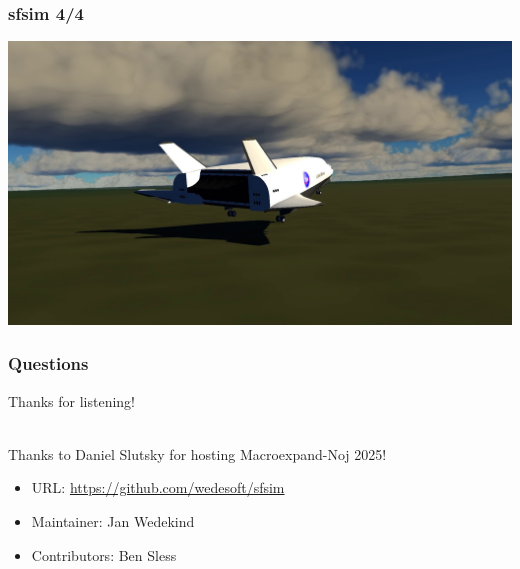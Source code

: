 \documentclass[aspectratio=169,11pt,xcolor=dvipsnames]{beamer}
\begin{document}
\begin{frame}
  \frametitle{sfsim 4/4}
  \begin{center}
    \includegraphics[width=.84\textwidth]{sfsim3}
  \end{center}
\end{frame}

\begin{frame}
  \frametitle{Questions}
  \begin{center}
    \begin{huge}
      Thanks for listening!
    \end{huge}\\
    \vspace{24pt}
    Thanks to Daniel Slutsky for hosting Macroexpand-Noj 2025!\\
    \vspace{24pt}
    \begin{minipage}[t]{.6\textwidth}
      \begin{itemize}
        \item URL: \url{https://github.com/wedesoft/sfsim}
        \item Maintainer: Jan Wedekind
        \item Contributors: Ben Sless
      \end{itemize}
    \end{minipage}
  \end{center}
\end{frame}
\end{document}
